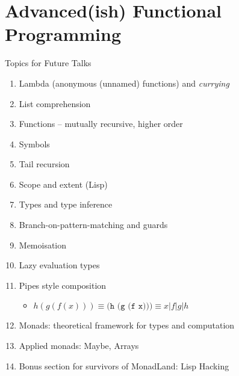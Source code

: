 \documentclass[presentation]{beamer}
\begin{document}
\section{Advanced(ish) Functional Programming}
\begin{frame}{Topics for Future Talks}
\label{sec:org95ddb74}

\begin{enumerate}
\item Lambda (anonymous (unnamed) functions) and \emph{currying}
\item List comprehension
\item Functions -- mutually recursive, higher order
\item Symbols
\item Tail recursion
\item Scope and extent (Lisp)
\item Types and type inference
\item Branch-on-pattern-matching and guards
\item Memoisation
\item Lazy evaluation types
\item Pipes style composition
\begin{itemize}
\item  \(h(g(f(x)))\equiv\texttt{(h (g (f x)))}\equiv{}x\vert{f}\vert{g}\vert{h}\)
\end{itemize}
\item Monads: theoretical framework for types and computation
\item Applied monads: Maybe, Arrays
\item Bonus section for survivors of MonadLand: Lisp Hacking
\end{enumerate}

\end{frame}
\end{document}
